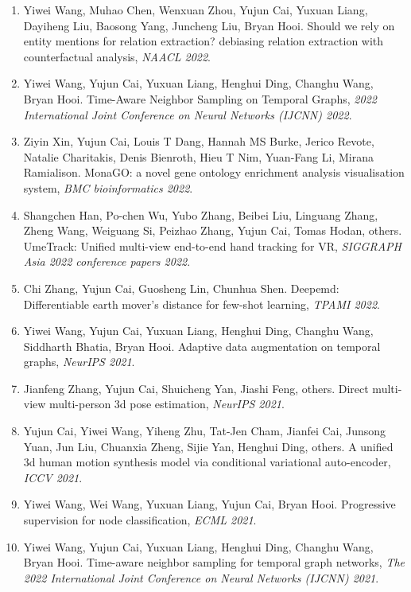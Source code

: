 \begin{enumerate}
\item Yiwei Wang, Muhao Chen, Wenxuan Zhou, Yujun Cai, Yuxuan Liang, Dayiheng Liu, Baosong Yang, Juncheng Liu, Bryan Hooi. Should we rely on entity mentions for relation extraction? debiasing relation extraction with counterfactual analysis, \textit{NAACL 2022}.

\item Yiwei Wang, Yujun Cai, Yuxuan Liang, Henghui Ding, Changhu Wang, Bryan Hooi. Time-Aware Neighbor Sampling on Temporal Graphs, \textit{2022 International Joint Conference on Neural Networks (IJCNN) 2022}.

\item Ziyin Xin, Yujun Cai, Louis T Dang, Hannah MS Burke, Jerico Revote, Natalie Charitakis, Denis Bienroth, Hieu T Nim, Yuan-Fang Li, Mirana Ramialison. MonaGO: a novel gene ontology enrichment analysis visualisation system, \textit{BMC bioinformatics 2022}.

\item Shangchen Han, Po-chen Wu, Yubo Zhang, Beibei Liu, Linguang Zhang, Zheng Wang, Weiguang Si, Peizhao Zhang, Yujun Cai, Tomas Hodan, others. UmeTrack: Unified multi-view end-to-end hand tracking for VR, \textit{SIGGRAPH Asia 2022 conference papers 2022}.

\item Chi Zhang, Yujun Cai, Guosheng Lin, Chunhua Shen. Deepemd: Differentiable earth mover's distance for few-shot learning, \textit{TPAMI 2022}.

\item Yiwei Wang, Yujun Cai, Yuxuan Liang, Henghui Ding, Changhu Wang, Siddharth Bhatia, Bryan Hooi. Adaptive data augmentation on temporal graphs, \textit{NeurIPS 2021}.

\item Jianfeng Zhang, Yujun Cai, Shuicheng Yan, Jiashi Feng, others. Direct multi-view multi-person 3d pose estimation, \textit{NeurIPS 2021}.

\item Yujun Cai, Yiwei Wang, Yiheng Zhu, Tat-Jen Cham, Jianfei Cai, Junsong Yuan, Jun Liu, Chuanxia Zheng, Sijie Yan, Henghui Ding, others. A unified 3d human motion synthesis model via conditional variational auto-encoder, \textit{ICCV 2021}.

\item Yiwei Wang, Wei Wang, Yuxuan Liang, Yujun Cai, Bryan Hooi. Progressive supervision for node classification, \textit{ECML 2021}.

\item Yiwei Wang, Yujun Cai, Yuxuan Liang, Henghui Ding, Changhu Wang, Bryan Hooi. Time-aware neighbor sampling for temporal graph networks, \textit{The 2022 International Joint Conference on Neural Networks (IJCNN) 2021}.


\end{enumerate}

